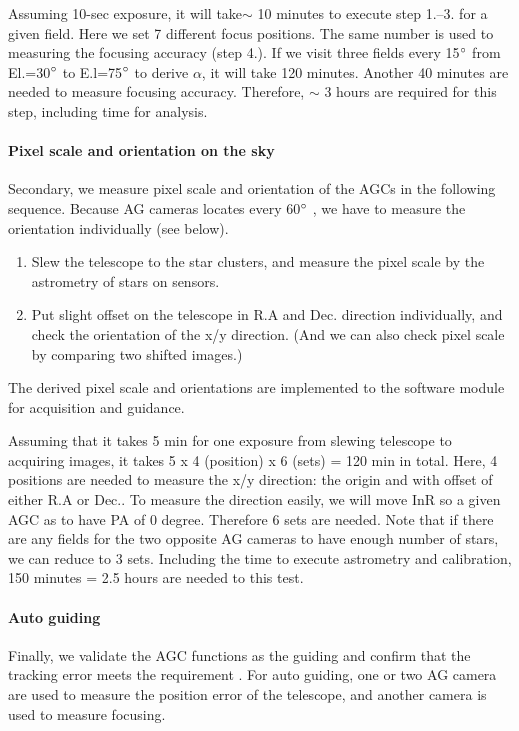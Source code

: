 Assuming 10-sec exposure, it will take$\sim$ 10 minutes to execute step 1.--3. for a given field.
Here we set 7 different focus positions.
The same number is used to measuring the focusing accuracy (step 4.).
If we visit three fields every 15$^\circ$ from El.=30$^\circ$ to E.l=75$^\circ$ to derive $\alpha$, it will take 120 minutes.
Another 40 minutes are needed to measure focusing accuracy.
Therefore, $\sim$ 3 hours are required for this step, including time for analysis.

\paragraph{Pixel scale and orientation on the sky}
Secondary, we measure pixel scale and orientation of the AGCs in the following sequence.
Because AG cameras locates every 60$^\circ$ , we have to measure the orientation individually (see below).

\begin{enumerate}
\item Slew the telescope to the star clusters, and measure the pixel scale by the astrometry of stars on sensors.
\item Put slight offset on the telescope in R.A and Dec. direction individually, and check the orientation of the x/y direction.
(And we can also check pixel scale by comparing two shifted images.)
\end{enumerate}
The derived pixel scale and orientations are implemented to the software module for acquisition and guidance.

Assuming that it takes 5 min for one exposure from slewing telescope to acquiring images, 
it takes 5 x 4 (position) x 6 (sets) = 120 min in total.
Here, 4 positions are needed  to measure the x/y  direction: the origin and with offset of either R.A or Dec..
To measure the direction easily, we will move InR so a given AGC as to have PA of 0 degree.
Therefore 6 sets are needed.
Note that if there are any fields for the two opposite AG cameras to have enough number of stars, we can reduce to 3 sets.
Including the time to execute astrometry and calibration, 150 minutes = 2.5 hours are needed to this test.


\paragraph{Auto guiding}
Finally, we validate the AGC functions as the guiding and confirm that the tracking error meets the requirement .
For auto guiding, one or two AG camera are used to measure the position error of the telescope, and another camera is used to measure focusing.

